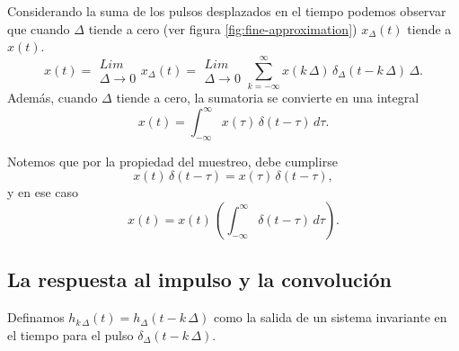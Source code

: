 
Considerando la suma de los pulsos desplazados en el tiempo 
podemos observar que cuando $\Delta $ tiende a cero (ver figura \ref{fig:fine-approximation}) $x_{\Delta }\left( t\right) $ tiende a $x\left( t\right).$
\begin{equation}
        x\left( t\right) =      
\begin{array}{l}
    Lim \\ 
    \Delta \rightarrow 0
\end{array}
x_{\Delta }\left( t\right) = 
\begin{array}{l}
    Lim \\ 
    \Delta \rightarrow 0
\end{array}
   \sum_{k=-\infty }^{\infty }x\left( k \, \Delta \right) \, \delta _{\Delta }\left(t-k \, \Delta \right) \, \Delta .
\end{equation}
Adem\'{a}s, cuando $\Delta $ tiende a cero, la sumatoria se convierte en una integral 
\begin{equation}
        x\left( t\right) =\int_{-\infty }^{\infty }x\left( \tau \right) \, \delta\left( t-\tau \right) \, d\tau .
        \label{integral.convolucion}
\end{equation}

Notemos que por la propiedad del muestreo, debe cumplirse 
\begin{equation} 
     x\left( t\right) \, \delta \left( t-\tau \right) =
   x\left( \tau \right) \, \delta \left( t-\tau \right),
\end{equation}
y en ese caso 
\begin{equation}
 x\left( t\right) = 
  x\left( t\right) \, \left( \int_{-\infty }^{\infty } \delta \left( t-\tau \right) \, d\tau \right) .
\end{equation}

\subsection{La respuesta al impulso y la convolución}

Definamos $h_{k \, \Delta }(t) = h_{\Delta }\left( t-k \, \Delta \right)$ como la salida de un sistema invariante en el tiempo para el pulso 
$\delta _{\Delta }(t-k \, \Delta ).$ 

